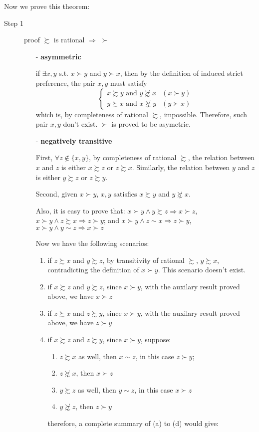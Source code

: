 Now we prove this theorem:
\begin{description}
    \item[Step 1] proof $\succsim$ is rational $\Rightarrow$ $\succ$ 
    \begin{itemize}
        \item[-] \textbf{asymmetric}
        
        if $\exists x,y$ s.t. $x\succ y$ and $y\succ x$, then by the definition of induced strict preference, the pair $x,y$ must satisfy 
        $$\begin{cases}
        x\succsim y\text{ and }y\not\succsim x & (x\succ y)\\
        y\succsim x\text{ and }x\not\succsim y & (y\succ x)
        \end{cases}$$
        which is, by completeness of rational $\succsim$, impossible. Therefore, such pair $x,y$ don't exist. $\succ$ is proved to be asymetric.
        
        \item[-] \textbf{negatively transitive}
        
        First, $\forall z\notin\{x,y\}$, by completeness of rational $\succsim$, the relation between $x$ and $z$ is either $x\succsim z$ or $z\succsim x$.
        Similarly, the relation between $y$ and $z$ is either $y\succsim z$ or $z\succsim y$.
        
        Second, given $x\succ y$, $x,y$ satisfies $x\succsim y$ and $y\not\succsim x$.
        
        Also, it is easy to prove that: $x\succ y \land y\succsim z \Rightarrow x\succ z$, $x\succ y \land z\succsim x\Rightarrow z\succ y$; and $x\succ y\land z\sim x\Rightarrow z\succ y$, $x\succ y\land y\sim z\Rightarrow x\succ z$

        Now we have the following scenarios:
        \begin{enumerate}
        \item if $z\succsim x$ and $y\succsim z$, by transitivity of rational
        $\succsim$, $y\succsim x$, contradicting the definition of $x\succ y$.
        This scenario doesn't exist.
        \item if $x\succsim z$ and $y\succsim z$, since $x\succ y$, with the
        auxilary result proved above, we have $x\succ z$
        \item if $z\succsim x$ and $z\succsim y$, since $x\succ y$, with the
        auxilary result proved above, we have $z\succ y$
        \item if $x\succsim z$ and $z\succsim y$, since $x\succ y$, suppose:
        \begin{enumerate}
        \item $z\succsim x$ as well, then $x\sim z$, in this case $z\succ y$;
        \item $z\not\succsim x$, then $x\succ z$
        \item $y\succsim z$ as well, then $y\sim z$, in this case $x\succ z$
        \item $y\not\succsim z$, then $z\succ y$
        \end{enumerate}
        therefore, a complete summary of (a) to (d) would give:
        

\end{enumerate}
\end{itemize}
\end{description}
